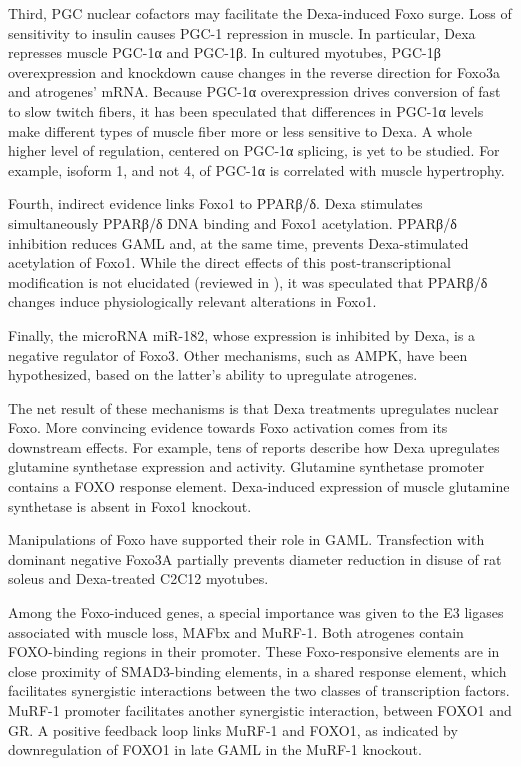 \documentclass[12pt,english]{report}\usepackage[]{graphicx}\usepackage[]{color}
\begin{document}
Third, PGC nuclear cofactors may facilitate the Dexa-induced Foxo
surge. Loss of sensitivity to insulin causes PGC-1 repression in muscle\citep{ling2004multiple}.
In particular, Dexa represses muscle PGC-1α\citep{qin2010protection,jesinkey2014atomoxetine}
and PGC-1β\citep{menconi2010sepsis}. In cultured myotubes, PGC-1β
overexpression and knockdown cause changes in the reverse direction
for Foxo3a and atrogenes' mRNA. Because PGC-1α overexpression drives
conversion of fast to slow twitch fibers\citep{lin2002transcriptional},
it has been speculated that differences in PGC-1α levels make different
types of muscle fiber more or less sensitive to Dexa\citep{schiaffino2013mechanisms}.
A whole higher level of regulation, centered on PGC-1α splicing, is
yet to be studied. For example, isoform 1, and not 4, of PGC-1α is
correlated with muscle hypertrophy\citep{ruas2012pgc-1alpha}.

Fourth, indirect evidence links Foxo1 to PPARβ/δ. Dexa stimulates
simultaneously PPARβ/δ DNA binding and Foxo1 acetylation\citep{castillero2013ppar/}.
PPARβ/δ inhibition reduces GAML and, at the same time, prevents Dexa-stimulated
acetylation of Foxo1. While the direct effects of this post-transcriptional
modification is not elucidated (reviewed in \citep{daitoku2011regulation,nakae2008foxo}),
it was speculated that PPARβ/δ changes induce physiologically relevant
alterations in Foxo1.

Finally, the microRNA miR-182, whose expression is inhibited by Dexa,
is a negative regulator of Foxo3\citep{hudson2014mir-182}. Other
mechanisms, such as AMPK, have been hypothesized, based on the latter's
ability to upregulate atrogenes.

The net result of these mechanisms is that Dexa treatments upregulates
nuclear Foxo\citep{qin2010protection}. More convincing evidence towards
Foxo activation comes from its downstream effects. For example, tens
of reports describe how Dexa upregulates glutamine synthetase expression
and activity\citep{king1983glutamine}. Glutamine synthetase promoter
contains a FOXO response element. Dexa-induced expression of muscle
glutamine synthetase is absent in Foxo1 knockout\citep{kamei2014foxo1}.

Manipulations of Foxo have supported their role in GAML. Transfection
with dominant negative Foxo3A partially prevents diameter reduction
in disuse of rat soleus and Dexa-treated C2C12 myotubes\citep{sandri2004foxo,senf2010foxo}.

Among the Foxo-induced genes, a special importance was given to the
E3 ligases associated with muscle loss, MAFbx and MuRF-1\citep{stitt2004igf-1/pi3k/akt}.
Both atrogenes contain FOXO-binding regions in their promoter\citep{sandri2004foxo,sandri2006pgc-1alpha,waddell2008glucocorticoid}.
These Foxo-responsive elements are in close proximity of SMAD3-binding
elements, in a shared response element, which facilitates synergistic
interactions between the two classes of transcription factors\citep{bollinger2014smad3}.
MuRF-1 promoter facilitates another synergistic interaction, between
FOXO1 and GR\citep{waddell2008glucocorticoid}. A positive feedback
loop links MuRF-1 and FOXO1, as indicated by downregulation of FOXO1
in late GAML in the MuRF-1 knockout\citep{furlow2013altered}.
\end{document}
